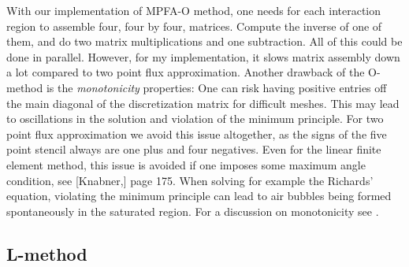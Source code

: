\documentclass[../Main/main.tex]{subfiles}
\begin{document}
	With our implementation of MPFA-O method, one needs for each interaction region to assemble four, four by four, matrices. Compute the inverse of one of them, and do two matrix multiplications and one subtraction. All of this could be done in parallel. However, for my implementation, it slows matrix assembly down a lot compared to two point flux approximation. Another drawback of the O-method is the \emph{monotonicity} properties: One can risk having positive entries off the main diagonal of the discretization matrix for difficult meshes. This may lead to oscillations in the solution and violation of the minimum principle. For two point flux approximation we avoid this issue altogether, as the signs of the five point stencil always are one plus and four negatives. Even for the linear finite element method, this issue is avoided if one imposes some maximum angle condition, see [Knabner,\cite{Knabner}] page 175. When solving for example the Richards' equation, violating the minimum principle can lead to air bubbles being formed spontaneously in the saturated region. For a discussion on monotonicity see \cite{10.1007/s00211-006-0060-z}.
	\subsection{L-method}
\end{document}
